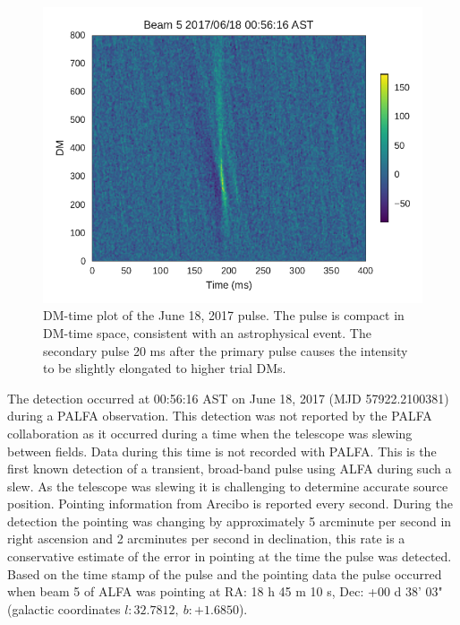 \documentclass[a4paper,fleqn,usenatbib]{mnras}
\begin{document}
\begin{figure}
    \includegraphics[width=1.0\linewidth]{figures/Beam5_fb_D20170618T005616_buffer2_dmspace.pdf}
    \caption{DM-time plot of the June 18, 2017 pulse. The pulse is compact in
    DM-time space, consistent with an astrophysical event. The secondary pulse
    20 ms after the primary pulse causes the intensity to be slightly elongated
    to higher trial DMs.
    }
    \label{fig:D20170618_dmspace}
\end{figure}

The detection occurred at 00:56:16 AST on June 18, 2017 (MJD 57922.2100381)
during a PALFA observation. This detection was not reported by the PALFA
collaboration as it occurred during a time when the telescope was slewing
between fields. Data during this time is not recorded with PALFA. This is the
first known detection of a transient, broad-band pulse using ALFA during such a
slew. As the telescope was slewing it is challenging to determine accurate
source position. Pointing information from Arecibo is reported every second.
During the detection the pointing was changing by approximately 5 arcminute per
second in right ascension and 2 arcminutes per second in declination, this rate
is a conservative estimate of the error in pointing at the time the pulse was
detected. Based on the time stamp of the pulse and the pointing data the pulse
occurred when beam 5 of ALFA was pointing at RA: 18 h 45 m 10 s, Dec: +00 d 38'
03" (galactic coordinates $l: 32.7812, ~b: +1.6850$).
\end{document}

